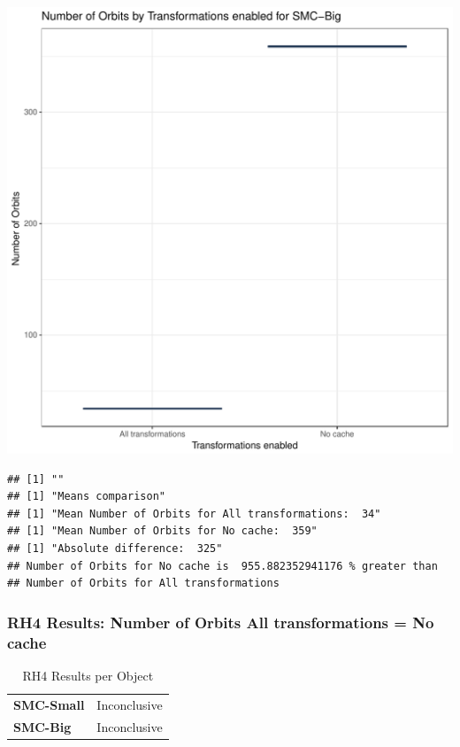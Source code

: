 \documentclass{article}\usepackage[]{graphicx}\usepackage[]{color}
\makeatletter
\def\maxwidth{ %
  \ifdim\Gin@nat@width>\linewidth
    \linewidth
  \else
    \Gin@nat@width
  \fi
}
\newenvironment{kframe}{%
 \def\at@end@of@kframe{}%
 \ifinner\ifhmode%
  \def\at@end@of@kframe{\end{minipage}}%
  \begin{minipage}{\columnwidth}%
 \fi\fi%
 \def\FrameCommand##1{\hskip\@totalleftmargin \hskip-\fboxsep
 \colorbox{shadecolor}{##1}\hskip-\fboxsep
     \hskip-\linewidth \hskip-\@totalleftmargin \hskip\columnwidth}%
 \MakeFramed {\advance\hsize-\width
   \@totalleftmargin\z@ \linewidth\hsize
   \@setminipage}}%
 {\par\unskip\endMakeFramed%
 \at@end@of@kframe}
\newenvironment{knitrout}{}{} %
\makeatother
\begin{document}
\begin{knitrout}
\color{fgcolor}
\includegraphics[width=\maxwidth]{figure/RH4_big-1} 
\begin{kframe}

{\ttfamily\noindent\bfseries\color{errorcolor}{\#\# Error in eval(expr, envir, enclos): object 'shap\_cashew\_big' not found}}\begin{verbatim}
## [1] ""
## [1] "Means comparison"
## [1] "Mean Number of Orbits for All transformations:  34"
## [1] "Mean Number of Orbits for No cache:  359"
## [1] "Absolute difference:  325"
## Number of Orbits for No cache is  955.882352941176 % greater than 
## Number of Orbits for All transformations
\end{verbatim}
\end{kframe}
\end{knitrout}


 

	
	\subsubsection{RH4 Results: Number of Orbits All transformations = No cache}
	
	
	\begin{table}[H]
	\centering
	\caption{RH4 Results per Object}
	\begin{tabular}{ll}
	\textbf{SMC-Small} & Inconclusive \\
	\textbf{SMC-Big} & Inconclusive \\
	\end{tabular}
	\end{table}
\end{document}
